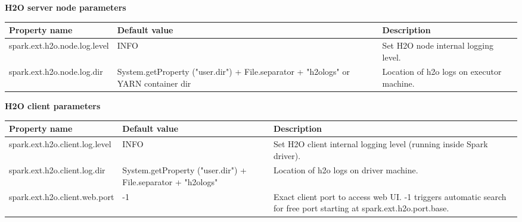 \textbf{H2O server node parameters}
\begin{table}[!ht]
\centering
{\small
\begin{tabular}{l p{3.0cm} p{3.0cm}}
\toprule
Property name & Default value  & Description \\
\midrule
		
spark.ext.h2o.node.log.level & INFO & Set H2O node internal logging level.\\  \addlinespace

spark.ext.h2o.node.log.dir  & System.getProperty ("user.dir") + File.separator + "h2ologs" or YARN container dir &	Location of h2o logs on executor machine.\\

\bottomrule
\end{tabular} 
} %
\end{table}

\textbf{H2O client parameters}
\begin{table}[!ht]
\centering
{\small
\begin{tabular}{l p{3.0cm} p{3.0cm}}
\toprule
Property name & Default value  & Description \\
\midrule

spark.ext.h2o.client.log.level & INFO & Set H2O client internal logging level (running inside Spark driver).\\  \addlinespace

spark.ext.h2o.client.log.dir & System.getProperty ("user.dir") + File.separator + "h2ologs" & Location of h2o logs on driver machine.\\  \addlinespace

spark.ext.h2o.client.web.port & -1 & Exact client port to access web UI. -1 triggers automatic search for free port starting at spark.ext.h2o.port.base.\\  
\bottomrule
\end{tabular} 
} %
\end{table}
